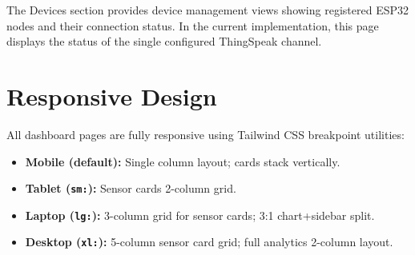 The Devices section provides device management views showing registered ESP32 nodes and their connection status. In the current implementation, this page displays the status of the single configured ThingSpeak channel.

\section{Responsive Design}

All dashboard pages are fully responsive using Tailwind CSS breakpoint utilities:
\begin{itemize}[leftmargin=1.5em]
  \item \textbf{Mobile (default):} Single column layout; cards stack vertically.
  \item \textbf{Tablet (\texttt{sm:}):} Sensor cards 2-column grid.
  \item \textbf{Laptop (\texttt{lg:}):} 3-column grid for sensor cards; 3:1 chart+sidebar split.
  \item \textbf{Desktop (\texttt{xl:}):} 5-column sensor card grid; full analytics 2-column layout.
\end{itemize}
